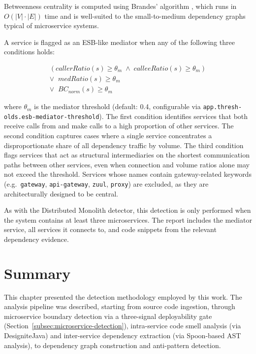 \noindent Betweenness centrality is computed using Brandes' algorithm \cite{Brandes2001}, which runs in $O(|V| \cdot |E|)$ time and is well-suited to the small-to-medium dependency graphs typical of microservice systems.

A service is flagged as an ESB-like mediator when any of the following three conditions holds:

\begin{equation}
    \begin{array}{c}
        (\mathit{callerRatio}(s) \geq \theta_m \;\wedge\; \mathit{calleeRatio}(s) \geq \theta_m) \\[4pt]
        \vee\;\; \mathit{medRatio}(s) \geq \theta_m \\[4pt]
        \vee\;\; BC_{\mathit{norm}}(s) \geq \theta_m
    \end{array}
    \label{eq:esb-decision}
\end{equation}

\noindent where $\theta_m$ is the mediator threshold (default: 0.4, configurable via \texttt{app.thres\-h-olds.esb-mediator-threshold}). The first condition identifies services that both receive calls from and make calls to a high proportion of other services. The second condition captures cases where a single service concentrates a disproportionate share of all dependency traffic by volume. The third condition flags services that act as structural intermediaries on the shortest communication paths between other services, even when connection and volume ratios alone may not exceed the threshold. Services whose names contain gateway-related keywords (e.g.\ \texttt{gateway}, \texttt{api-gateway}, \texttt{zuul}, \texttt{proxy}) are excluded, as they are architecturally designed to be central.

As with the Distributed Monolith detector, this detection is only performed when the system contains at least three microservices. The report includes the mediator service, all services it connects to, and code snippets from the relevant dependency evidence.

\section{Summary}
\label{sec:ch3-summary}

\par This chapter presented the detection methodology employed by this work. The analysis pipeline was described, starting from source code ingestion, through microservice boundary detection via a three-signal deployability gate (Section~\ref{subsec:microservice-detection}), intra-service code smell analysis (via DesigniteJava) and inter-service dependency extraction (via Spoon-based AST analysis), to dependency graph construction and anti-pattern detection.

